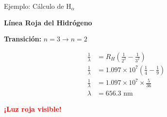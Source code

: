\documentclass[12pt,aspectratio=169]{beamer}
\begin{document}
\begin{frame}{Ejemplo: Cálculo de H$_\alpha$}
    \begin{center}
        \huge \textbf{Línea Roja del Hidrógeno}
    \end{center}
    
    \vspace{0.5cm}
    \begin{center}
        \Large \textbf{Transición:} $n = 3 \rightarrow n = 2$
    \end{center}
    
    \vspace{1cm}
    \begin{align}
        \frac{1}{\lambda} &= R_H\left(\frac{1}{2^2} - \frac{1}{3^2}\right) \\[0.5cm]
        \frac{1}{\lambda} &= 1.097 \times 10^7 \left(\frac{1}{4} - \frac{1}{9}\right) \\[0.5cm]
        \frac{1}{\lambda} &= 1.097 \times 10^7 \times \frac{5}{36} \\[0.5cm]
        \lambda &= \boxed{656.3 \text{ nm}}
    \end{align}
    
    \vspace{0.5cm}
    \begin{center}
        \LARGE \textcolor{red}{\textbf{¡Luz roja visible!}}
    \end{center}
\end{frame}
\end{document}
